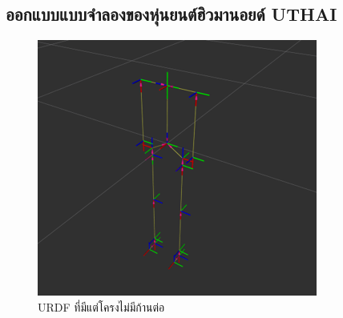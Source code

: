 \subsection{ออกแบบแบบจำลองของหุ่นยนต์ฮิวมานอยด์ UTHAI}

\begin{figure}[!ht]
	\centering
	\includegraphics[width=\textwidth]{chapter4/images/urdf_rviz0.png}
	\caption{URDF ที่มีแต่โครงไม่มีก้านต่อ}
\end{figure}
